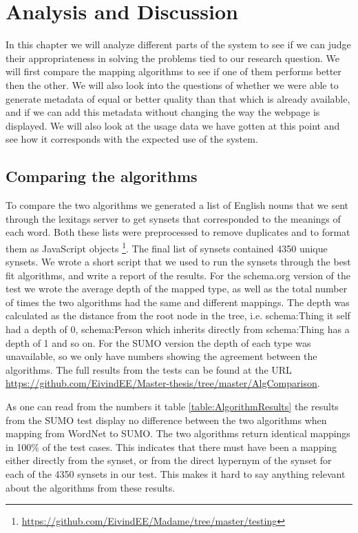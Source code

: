
\chapter{Analysis and Discussion} %

\label{AnalysisAndDiscussion}


In this chapter we will analyze different parts of the system to see if we can judge their appropriateness in solving the
problems tied to our research question.
We will first compare the mapping algorithms to see if one of them performs better then the other.
We will also look into the questions of whether we were able to generate metadata of equal or better quality than that
which is already available, and if we can add this metadata without changing the way the webpage is displayed.
We will also look at the usage data we have gotten at this point and see how it corresponds with the expected use of the system.

\section{Comparing the algorithms}
\label{ComparingAlgorithms}
To compare the two algorithms we generated a list of English nouns
that we sent through the lexitags server to get synsets that corresponded to the meanings of each word.
Both these lists were preprocessed to remove duplicates and to format them as JavaScript objects
\footnote{\url{https://github.com/EivindEE/Madame/tree/master/testing}}.
The final list of synsets contained 4350 unique synsets.
We wrote a short script that we used to run the synsets through the best fit algorithms,
and write a report of the results.
For the schema.org version of the test we wrote the average depth of the mapped type,
as well as the total number of times the two algorithms had the same and different mappings.
The depth was calculated as the distance from the root node in the tree,
i.e. schema:Thing it self had a depth of 0,
schema:Person which inherits directly from schema:Thing has a depth of 1 and so on.
For the SUMO version the depth of each type was unavailable,
so we only have numbers showing the agreement between the algorithms.
The full results from the tests can be found at the URL \url{https://github.com/EivindEE/Master-thesis/tree/master/AlgComparison}.

As one can read from the numbers it table \ref{table:AlgorithmResults} the results from the SUMO test
display no difference between the two algorithms when mapping from WordNet to SUMO.
The two algorithms return identical mappings in 100\% of the test cases.
This indicates that there must have been a mapping either directly from the synset,
or from the direct hypernym of the synset for each of the 4350 synsets in our test.
This makes it hard to say anything relevant about the algorithms from these results.

